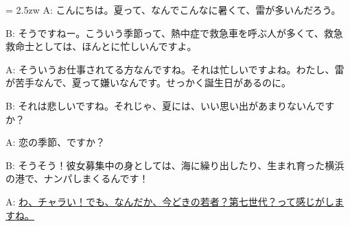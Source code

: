 \documentclass[11pt]{amsart}
\title{}
\author{}
\newenvironment{hangall}[1]{\hangindent = 2.5zw\everypar{\hangindent = 2.5zw}}{}
\begin{document}
\maketitle
\begin{hangall}{}%
A: こんにちは。夏って、なんでこんなに暑くて、雷が多いんだろう。

B: そうですねー。こういう季節って、熱中症で救急車を呼ぶ人が多くて、救急救命士としては、ほんとに忙しいんですよ。

A: そういうお仕事されてる方なんですね。それは忙しいですよね。わたし、雷が苦手なんで、夏って嫌いなんです。せっかく誕生日があるのに。

B: それは悲しいですね。それじゃ、夏には、いい思い出があまりないんですか？

A: 恋の季節、ですか？

B: そうそう！彼女募集中の身としては、海に繰り出したり、生まれ育った横浜の港で、ナンパしまくるんです！

A: \ul{わ、チャラい！でも、なんだか、今どきの若者？第七世代？って感じがしますね。}\end{hangall}
\end{document}
